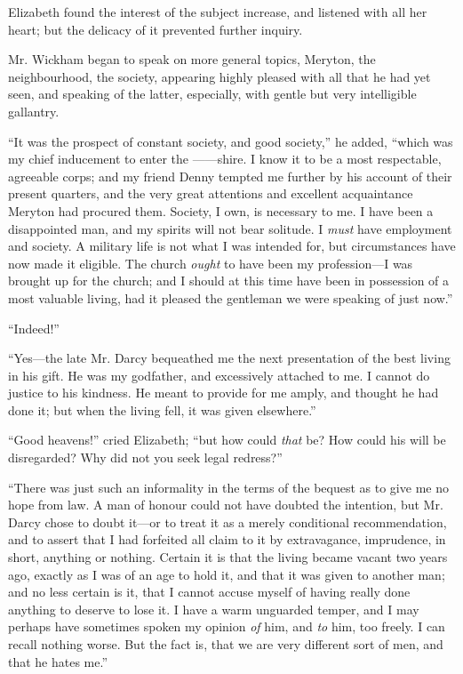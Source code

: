 Elizabeth found the interest of the subject increase, and listened with all her heart; but the delicacy of it prevented further inquiry.

Mr. Wickham began to speak on more general topics, Meryton, the neighbourhood, the society, appearing highly pleased with all that he had yet seen, and speaking of the latter, especially, with gentle but very intelligible gallantry.

``It was the prospect of constant society, and good society,'' he added, ``which was my chief inducement to enter the ------shire. I know it to be a most respectable, agreeable corps; and my friend Denny tempted me further by his account of their present quarters, and the very great attentions and excellent acquaintance Meryton had procured them. Society, I own, is necessary to me. I have been a disappointed man, and my spirits will not bear solitude. I \textit{must} have employment and society. A military life is not what I was intended for, but circumstances have now made it eligible. The church \textit{ought} to have been my profession---I was brought up for the church; and I should at this time have been in possession of a most valuable living, had it pleased the gentleman we were speaking of just now.''

``Indeed!''

``Yes---the late Mr. Darcy bequeathed me the next presentation of the best living in his gift. He was my godfather, and excessively attached to me. I cannot do justice to his kindness. He meant to provide for me amply, and thought he had done it; but when the living fell, it was given elsewhere.''

``Good heavens!'' cried Elizabeth; ``but how could \textit{that} be? How could his will be disregarded? Why did not you seek legal redress?''

``There was just such an informality in the terms of the bequest as to give me no hope from law. A man of honour could not have doubted the intention, but Mr. Darcy chose to doubt it---or to treat it as a merely conditional recommendation, and to assert that I had forfeited all claim to it by extravagance, imprudence, in short, anything or nothing. Certain it is that the living became vacant two years ago, exactly as I was of an age to hold it, and that it was given to another man; and no less certain is it, that I cannot accuse myself of having really done anything to deserve to lose it. I have a warm unguarded temper, and I may perhaps have sometimes spoken my opinion \textit{of} him, and \textit{to} him, too freely. I can recall nothing worse. But the fact is, that we are very different sort of men, and that he hates me.''

